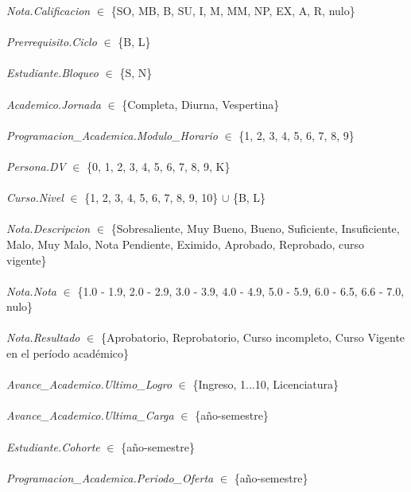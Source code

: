 \documentclass[12pt]{article}
\begin{document}
\textit{Nota.Calificacion} $\in$ \{SO, MB, B, SU, I, M, MM, NP, EX, A, R, nulo\}\\\\
\textit{Prerrequisito.Ciclo} $\in$ \{B, L\}\\\\
\textit{Estudiante.Bloqueo} $\in$ \{S, N\}\\\\
\textit{Academico.Jornada} $\in$ \{Completa, Diurna, Vespertina\}\\\\
\textit{Programacion\_Academica.Modulo\_Horario} $\in$ \{1, 2, 3, 4, 5, 6, 7, 8, 9\}\\\\
\textit{Persona.DV} $\in$ \{0, 1, 2, 3, 4, 5, 6, 7, 8, 9, K\}\\\\
\textit{Curso.Nivel} $\in$ \{1, 2, 3, 4, 5, 6, 7, 8, 9, 10\} $\cup$ \{B, L\}\\\\
\textit{Nota.Descripcion} $\in$ \{Sobresaliente, Muy Bueno, Bueno, Suficiente, Insuficiente, Malo, Muy Malo, Nota Pendiente, Eximido, Aprobado, Reprobado, curso vigente\}\\\\
\textit{Nota.Nota} $\in$ \{1.0 - 1.9, 2.0 - 2.9, 3.0 - 3.9, 4.0 - 4.9, 5.0 - 5.9, 6.0 - 6.5, 6.6 - 7.0, nulo\}\\\\
\textit{Nota.Resultado} $\in$ \{Aprobatorio, Reprobatorio, Curso incompleto, Curso Vigente en el período académico\}\\\\
\textit{Avance\_Academico.Ultimo\_Logro} $\in$ \{Ingreso, 1...10, Licenciatura\}\\\\
\textit{Avance\_Academico.Ultima\_Carga} $\in$ \{año-semestre\}\\\\
\textit{Estudiante.Cohorte} $\in$ \{año-semestre\}\\\\
\textit{Programacion\_Academica.Periodo\_Oferta} $\in$ \{año-semestre\}\\\\
\end{document}
